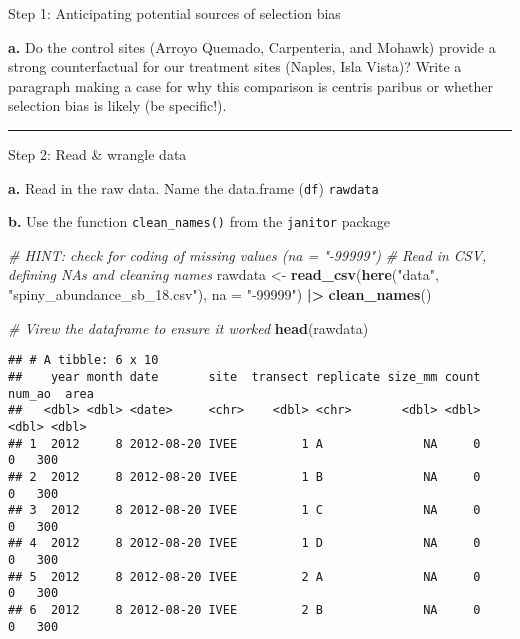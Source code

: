 \documentclass[
]{article}
\newenvironment{Shaded}{\begin{snugshade}}{\end{snugshade}}
\newcommand{\AttributeTok}[1]{\textcolor[rgb]{0.13,0.29,0.53}{#1}}
\newcommand{\CommentTok}[1]{\textcolor[rgb]{0.56,0.35,0.01}{\textit{#1}}}
\newcommand{\FunctionTok}[1]{\textcolor[rgb]{0.13,0.29,0.53}{\textbf{#1}}}
\newcommand{\NormalTok}[1]{#1}
\newcommand{\OtherTok}[1]{\textcolor[rgb]{0.56,0.35,0.01}{#1}}
\newcommand{\SpecialCharTok}[1]{\textcolor[rgb]{0.81,0.36,0.00}{\textbf{#1}}}
\newcommand{\StringTok}[1]{\textcolor[rgb]{0.31,0.60,0.02}{#1}}
\begin{document}
Step 1: Anticipating potential sources of selection bias

\textbf{a.} Do the control sites (Arroyo Quemado, Carpenteria, and
Mohawk) provide a strong counterfactual for our treatment sites (Naples,
Isla Vista)? Write a paragraph making a case for why this comparison is
centris paribus or whether selection bias is likely (be specific!).

\begin{center}\rule{0.5\linewidth}{0.5pt}\end{center}

Step 2: Read \& wrangle data

\textbf{a.} Read in the raw data. Name the data.frame (\texttt{df})
\texttt{rawdata}

\textbf{b.} Use the function \texttt{clean\_names()} from the
\texttt{janitor} package

\begin{Shaded}
\begin{Highlighting}[]
\CommentTok{\# HINT: check for coding of missing values (\textasciigrave{}na = "{-}99999"\textasciigrave{})}
\CommentTok{\# Read in CSV, defining NAs and cleaning names}
\NormalTok{rawdata }\OtherTok{\textless{}{-}} \FunctionTok{read\_csv}\NormalTok{(}\FunctionTok{here}\NormalTok{(}\StringTok{"data"}\NormalTok{, }\StringTok{"spiny\_abundance\_sb\_18.csv"}\NormalTok{), }\AttributeTok{na =} \StringTok{"{-}99999"}\NormalTok{) }\SpecialCharTok{|\textgreater{}}
    \FunctionTok{clean\_names}\NormalTok{()}

\CommentTok{\# Virew the dataframe to ensure it worked}
\FunctionTok{head}\NormalTok{(rawdata)}
\end{Highlighting}
\end{Shaded}

\begin{verbatim}
## # A tibble: 6 x 10
##    year month date       site  transect replicate size_mm count num_ao  area
##   <dbl> <dbl> <date>     <chr>    <dbl> <chr>       <dbl> <dbl>  <dbl> <dbl>
## 1  2012     8 2012-08-20 IVEE         1 A              NA     0      0   300
## 2  2012     8 2012-08-20 IVEE         1 B              NA     0      0   300
## 3  2012     8 2012-08-20 IVEE         1 C              NA     0      0   300
## 4  2012     8 2012-08-20 IVEE         1 D              NA     0      0   300
## 5  2012     8 2012-08-20 IVEE         2 A              NA     0      0   300
## 6  2012     8 2012-08-20 IVEE         2 B              NA     0      0   300
\end{verbatim}
\end{document}
